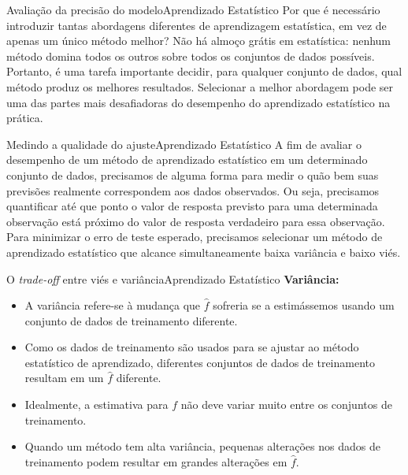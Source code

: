 \documentclass[t]{beamer}
\begin{document}

\begin{ftst}{Avaliação da precisão do modelo}{{Aprendizado Estatístico}}
\justifying
Por que é necessário introduzir tantas abordagens diferentes de aprendizagem estatística, em vez de apenas um único método melhor? 
\vone
Não há almoço grátis em estatística: nenhum método domina todos os outros sobre todos os conjuntos de dados possíveis.
\vone
Portanto, é uma tarefa importante decidir, para qualquer conjunto de dados, qual método produz os melhores resultados. 
\vone
Selecionar a melhor abordagem pode ser uma das partes mais desafiadoras do desempenho do aprendizado estatístico na prática.
\end{ftst}


\begin{ftst}{Medindo a qualidade do ajuste}{{Aprendizado Estatístico}}
\justifying
A fim de avaliar o desempenho de um método de aprendizado estatístico em um determinado conjunto de dados, precisamos de alguma forma para medir o quão bem suas previsões realmente correspondem aos dados observados.
\vone
Ou seja, precisamos quantificar até que ponto o valor de resposta previsto para uma determinada observação está próximo do valor de resposta verdadeiro para essa observação.
\vone
Para minimizar o erro de teste esperado, precisamos selecionar um método de aprendizado estatístico que alcance simultaneamente baixa variância e baixo viés.
\end{ftst}


\begin{ftst}{O \textit{trade-off} entre viés e variância}{{Aprendizado Estatístico}}
\justifying
\textbf{Variância:}
\begin{itemize}
    \item A variância refere-se à mudança que $\hat{f}$ sofreria se a estimássemos usando um conjunto de dados de treinamento diferente. 
    \item Como os dados de treinamento são usados para se ajustar ao método estatístico de aprendizado, diferentes conjuntos de dados de treinamento resultam em um $\hat{f}$ diferente. 
    \item Idealmente, a estimativa para $f$ não deve variar muito entre os conjuntos de treinamento. 
    \item Quando um método tem alta variância, pequenas alterações nos dados de treinamento podem resultar em grandes alterações em $\hat{f}$.

\end{itemize}
\end{ftst}
\end{document}
